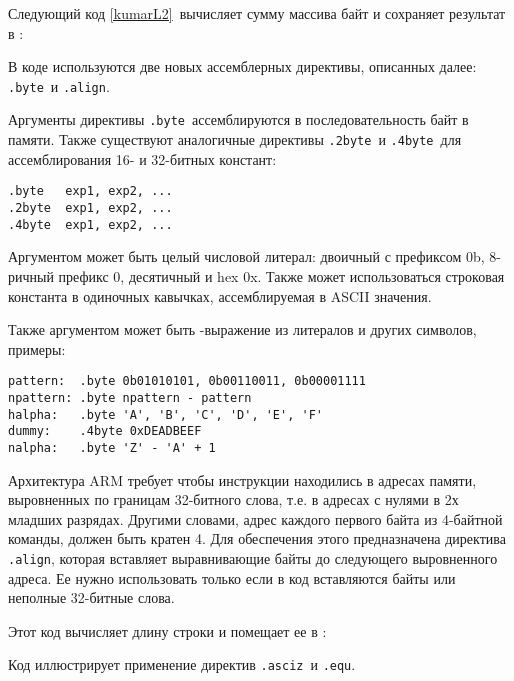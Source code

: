 \secdown

Следующий код \ref{kumarL2}\ вычисляет сумму массива байт и сохраняет результат
в :

\label{kumarL2}

В коде используются две новых ассемблерных директивы, описанных далее:
\verb|.byte|\ и \verb|.align|.


Аргументы директивы \verb|.byte|\ ассемблируются в последовательность байт в
памяти. Также существуют аналогичные директивы \verb|.2byte|\ и \verb|.4byte|\
для ассемблирования 16- и 32-битных констант:

\begin{verbatim}
.byte   exp1, exp2, ...
.2byte  exp1, exp2, ...
.4byte  exp1, exp2, ...
\end{verbatim}

Аргументом может быть целый числовой литерал: двоичный с префиксом 0b, 8-ричный
префикс 0, десятичный и hex 0x. Также может использоваться строковая константа в
одиночных кавычках, ассемблируемая в ASCII значения.

Также аргументом может быть \ci-выражение из литералов и других символов,
примеры:

\begin{verbatim}
pattern:  .byte 0b01010101, 0b00110011, 0b00001111
npattern: .byte npattern - pattern
halpha:   .byte 'A', 'B', 'C', 'D', 'E', 'F'
dummy:    .4byte 0xDEADBEEF
nalpha:   .byte 'Z' - 'A' + 1
\end{verbatim}


Архитектура ARM требует чтобы инструкции находились в адресах памяти,
выровненных по границам 32-битного слова, т.е. в адресах с нулями в 2х младших
разрядах. Другими словами, адрес каждого первого байта из 4-байтной команды,
должен быть кратен 4. Для обеспечения этого предназначена директива
\verb|.align|, которая вставляет выравнивающие байты до следующего выровненного
адреса. Ее нужно использовать только если в код вставляются байты или неполные
32-битные слова.

\secup

\secdown

Этот код вычисляет длину строки и помещает ее в :


Код иллюстрирует применение директив \verb|.asciz|\ и \verb|.equ|.

